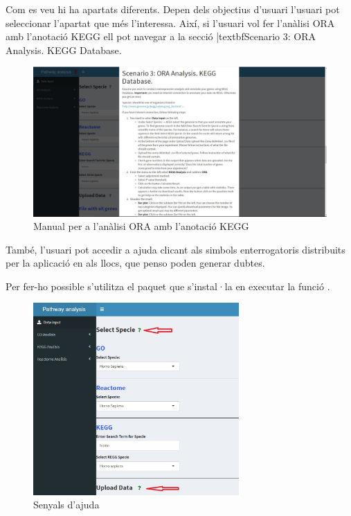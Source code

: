 \documentclass[]{article}
\begin{document}
Com es veu hi ha apartats diferents. Depen dels objectius d'usuari l'usuari pot seleccionar l'apartat que més l'interessa. Així, si l'usuari vol fer l'anàlisi ORA amb l'anotació KEGG ell pot navegar a la secció |textbf{Scenario 3: ORA Analysis. KEGG Database}. 

\begin{figure}[H]
\centering
\includegraphics[width=1\textwidth]{Manual2.jpg} 
\caption{Manual per a l'anàlisi ORA amb l'anotació KEGG}
\end{figure}


També, l'usuari pot accedir a ajuda clicant als simbols enterrogatoris distribuits per la aplicació en als llocs, que penso poden generar dubtes. 

Per fer-ho possible s'utilitza el paquet  que s'instal·la en executar la funció  .

\begin{figure}[H]
\centering
\includegraphics[width=0.7\textwidth]{Help_Data_Input.jpg} 
\caption{Senyals d'ajuda}
\end{figure}
\end{document}
